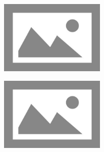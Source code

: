 \documentclass{thesis}
\begin{document}
\begin{figure}
  \caption{The most interesting image}
  \centering
  \begin{subfigure}{0.49\linewidth}
    \includegraphics[height=100pt,keepaspectratio=true]{./images/placeholder.png}
  \end{subfigure}
  \begin{subfigure}{0.49\linewidth}
    \includegraphics[height=100pt,keepaspectratio=true]{./images/placeholder.png}
  \end{subfigure}
\end{figure}

\blindmathpaper

\makeappendix
\end{document}
